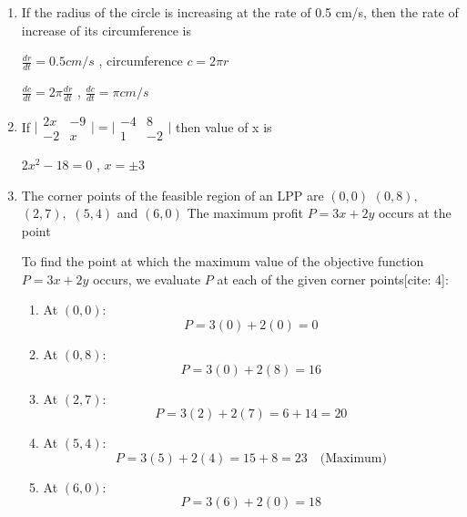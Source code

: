 \begin{enumerate}[label=\thesubsection.\arabic*, ref=\thesubsection.\theenumi]
$\vert{}\lambda \overrightarrow{a}\vert{} $ , $4\vert{}\lambda\vert{} \in [0,12]$

so,$$\vert{}\lambda\overrightarrow{a}\vert{} \in [0,12]$$

\item

If the radius of the circle is increasing at the rate of 0.5 cm/s, then the rate of increase of its circumference is   

\solution

$\frac{dr}{dt} =0.5 cm/s$ , circumference $c=2\pi r$

$\frac{dc}{dt}= 2\pi \frac{dr}{dt}$ , $\frac{dc}{dt} = \pi cm/s$

\item 

If $\vert{}\begin{matrix}2x&-9\\ -2&x\end{matrix}\vert{}=\vert{}\begin{matrix}-4&8\\ 1&-2\end{matrix}\vert{}$ then value of x is   

\solution

$2x^2 - 18 =0$ , $x=\pm 3$

\item 

The corner points of the feasible region of an LPP are $(0,0)$ $(0,8),$ $(2,7),$ $(5,4)$ and $(6,0)$ The maximum profit $P=3x+2y$ occurs at the point 

\solution

To find the point at which the maximum value of the objective function $P = 3x + 2y$ occurs, we evaluate $P$ at each of the given corner points[cite: 4]:

\begin{enumerate}
    \item At $(0,0)$:
    $$P = 3(0) + 2(0) = 0$$

    \item At $(0,8)$:
    $$P = 3(0) + 2(8) = 16$$

    \item At $(2,7)$:
    $$P = 3(2) + 2(7) = 6 + 14 = 20$$

    \item At $(5,4)$:
    $$P = 3(5) + 2(4) = 15 + 8 = 23 \quad \text{(Maximum)}$$

    \item At $(6,0)$:
    $$P = 3(6) + 2(0) = 18$$
\end{enumerate}




\end{enumerate}
